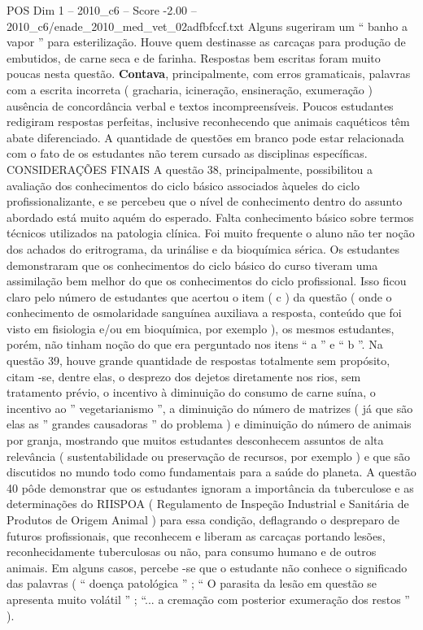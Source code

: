 \begin{textsample}{POS Dim 1 – 2010\_c6 – Score -2.00 – 2010\_c6/enade\_2010\_med\_vet\_02adfbfccf.txt}
Alguns sugeriram um “ banho a vapor ” para esterilização.
Houve quem destinasse as carcaças para produção de embutidos, de carne seca e de farinha.
Respostas bem escritas foram muito poucas nesta questão. \textbf{Contava}, principalmente, com erros gramaticais, palavras com a escrita incorreta ( gracharia, icineração, ensineração, exumeração ) ausência de concordância verbal e textos incompreensíveis.
Poucos estudantes redigiram respostas perfeitas, inclusive reconhecendo que animais caquéticos têm abate diferenciado.
A quantidade de questões em branco pode estar relacionada com o fato de os estudantes não terem cursado as disciplinas específicas.
CONSIDERAÇÕES FINAIS A questão 38, principalmente, possibilitou a avaliação dos conhecimentos do ciclo básico associados àqueles do ciclo profissionalizante, e se percebeu que o nível de conhecimento dentro do assunto abordado está muito aquém do esperado.
Falta conhecimento básico sobre termos técnicos utilizados na patologia clínica.
Foi muito frequente o aluno não ter noção dos achados do eritrograma, da urinálise e da bioquímica sérica.
Os estudantes demonstraram que os conhecimentos do ciclo básico do curso tiveram uma assimilação bem melhor do que os conhecimentos do ciclo profissional.
Isso ficou claro pelo número de estudantes que acertou o item ( c ) da questão ( onde o conhecimento de osmolaridade sanguínea auxiliava a resposta, conteúdo que foi visto em fisiologia e/ou em bioquímica, por exemplo ), os mesmos estudantes, porém, não tinham noção do que era perguntado nos itens “ a ” e “ b ”.
Na questão 39, houve grande quantidade de respostas totalmente sem propósito, citam -se, dentre elas, o desprezo dos dejetos diretamente nos rios, sem tratamento prévio, o incentivo à diminuição do consumo de carne suína, o incentivo ao ” vegetarianismo ”, a diminuição do número de matrizes ( já que são elas as ” grandes causadoras ” do problema ) e diminuição do número de animais por granja, mostrando que muitos estudantes desconhecem assuntos de alta relevância ( sustentabilidade ou preservação de recursos, por exemplo ) e que são discutidos no mundo todo como fundamentais para a saúde do planeta.
A questão 40 pôde demonstrar que os estudantes ignoram a importância da tuberculose e as determinações do RIISPOA ( Regulamento de Inspeção Industrial e Sanitária de Produtos de Origem Animal ) para essa condição, deflagrando o despreparo de futuros profissionais, que reconhecem e liberam as carcaças portando lesões, reconhecidamente tuberculosas ou não, para consumo humano e de outros animais.
Em alguns casos, percebe -se que o estudante não conhece o significado das palavras ( “ doença patológica ” ; “ O parasita da lesão em questão se apresenta muito volátil ” ; “... a cremação com posterior exumeração dos restos ” ).

\end{textsample}
